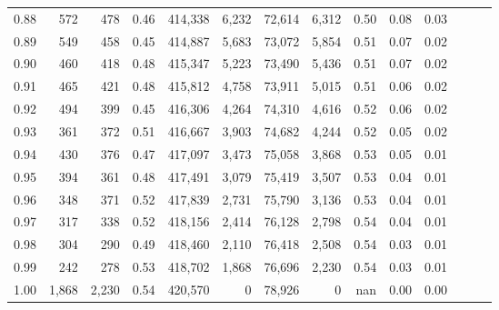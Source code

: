 \begin{tabular}{rrrrrrrrrrrrrr}
0.88 &     572 &    478 &  0.46 &  414,338 &    6,232 &  72,614 &   6,312 &  0.50 &  0.08 &      0.03 \\
0.89 &     549 &    458 &  0.45 &  414,887 &    5,683 &  73,072 &   5,854 &  0.51 &  0.07 &      0.02 \\
0.90 &     460 &    418 &  0.48 &  415,347 &    5,223 &  73,490 &   5,436 &  0.51 &  0.07 &      0.02 \\
0.91 &     465 &    421 &  0.48 &  415,812 &    4,758 &  73,911 &   5,015 &  0.51 &  0.06 &      0.02 \\
0.92 &     494 &    399 &  0.45 &  416,306 &    4,264 &  74,310 &   4,616 &  0.52 &  0.06 &      0.02 \\
0.93 &     361 &    372 &  0.51 &  416,667 &    3,903 &  74,682 &   4,244 &  0.52 &  0.05 &      0.02 \\
0.94 &     430 &    376 &  0.47 &  417,097 &    3,473 &  75,058 &   3,868 &  0.53 &  0.05 &      0.01 \\
0.95 &     394 &    361 &  0.48 &  417,491 &    3,079 &  75,419 &   3,507 &  0.53 &  0.04 &      0.01 \\
0.96 &     348 &    371 &  0.52 &  417,839 &    2,731 &  75,790 &   3,136 &  0.53 &  0.04 &      0.01 \\
0.97 &     317 &    338 &  0.52 &  418,156 &    2,414 &  76,128 &   2,798 &  0.54 &  0.04 &      0.01 \\
0.98 &     304 &    290 &  0.49 &  418,460 &    2,110 &  76,418 &   2,508 &  0.54 &  0.03 &      0.01 \\
0.99 &     242 &    278 &  0.53 &  418,702 &    1,868 &  76,696 &   2,230 &  0.54 &  0.03 &      0.01 \\
1.00 &   1,868 &  2,230 &  0.54 &  420,570 &        0 &  78,926 &       0 &   nan &  0.00 &      0.00 \\
\bottomrule
\end{tabular}
